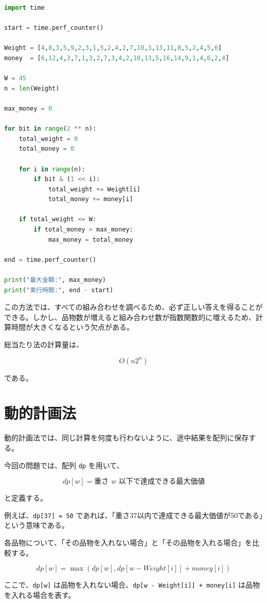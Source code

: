 \documentclass[dvipdfmx,a4paper,11pt]{jsarticle}
\begin{document}
\begin{lstlisting}[language=Python, caption=総当たり法による実装]
import time

start = time.perf_counter()

Weight = [4,8,3,5,9,2,3,1,5,2,4,2,7,10,3,13,11,8,5,2,4,5,6]
money  = [6,12,4,3,7,1,3,2,7,3,4,2,10,13,5,16,14,9,1,4,6,2,4]

W = 45
n = len(Weight)

max_money = 0

for bit in range(2 ** n):
    total_weight = 0
    total_money = 0

    for i in range(n):
        if bit & (1 << i):
            total_weight += Weight[i]
            total_money += money[i]

    if total_weight <= W:
        if total_money > max_money:
            max_money = total_money

end = time.perf_counter()

print("最大金額:", max_money)
print("実行時間:", end - start)
\end{lstlisting}

この方法では、すべての組み合わせを調べるため、必ず正しい答えを得ることができる。しかし、品物数が増えると組み合わせ数が指数関数的に増えるため、計算時間が大きくなるという欠点がある。

総当たり法の計算量は、

\[
O(n2^n)
\]

である。

\section{動的計画法}

動的計画法では、同じ計算を何度も行わないように、途中結果を配列に保存する。

今回の問題では、配列 \texttt{dp} を用いて、

\[
dp[w] = \text{重さ } w \text{ 以下で達成できる最大価値}
\]

と定義する。

例えば、\texttt{dp[37] = 50} であれば、「重さ37以内で達成できる最大価値が50である」という意味である。

各品物について、「その品物を入れない場合」と「その品物を入れる場合」を比較する。

\[
dp[w] = \max(dp[w], dp[w - Weight[i]] + money[i])
\]

ここで、\texttt{dp[w]} は品物を入れない場合、\texttt{dp[w - Weight[i]] + money[i]} は品物を入れる場合を表す。
\end{document}
